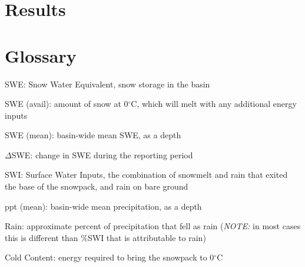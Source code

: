 \documentclass[11pt, oneside]{article}   	%
\begin{document}
\clearpage

\section*{Results}



\clearpage



\clearpage



\clearpage


\clearpage
\section*{Glossary}

\begin{itemize}
	\setlength\itemsep{0.05em}
	\footnotesize{
		\item[] SWE: Snow Water Equivalent, snow storage in the basin
		\item[] SWE (avail): amount of snow at 0$^{\circ}$C, which will melt with any additional energy inputs
		\item[] SWE (mean): basin-wide mean SWE, as a depth
		\item[] $\Delta$SWE: change in SWE during the reporting period
		\item[] SWI: Surface Water Inputs, the combination of snowmelt and rain that exited the base of the snowpack, and rain on bare ground
		\item[] ppt (mean): basin-wide mean precipitation, as a depth
		\item[] Rain: approximate percent of precipitation that fell as rain (\textit{NOTE:} in most cases this is different than \%SWI that is attributable to rain)
		\item[] Cold Content: energy required to bring the snowpack to 0$^{\circ}$C
	}
\end{itemize}

\vspace{1cm}
\end{document}
